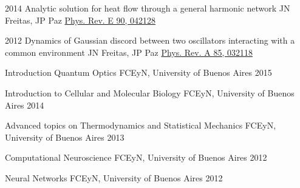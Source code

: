 \begin{cvpubs}
\cvpub
    {2014}
    {Analytic solution for heat flow through a general harmonic network}
    {JN Freitas, JP Paz}
    {\href{http://journals.aps.org/pre/abstract/10.1103/PhysRevE.90.042128}{Phys. Rev. E 90, 042128}}

\cvpub
    {2012}
    {Dynamics of Gaussian discord between two oscillators interacting with a common environment}
    {JN Freitas, JP Paz}
    {\href{http://pra.aps.org/abstract/PRA/v85/i3/e032118}{Phys. Rev. A 85, 032118}}

\end{cvpubs}


\begin{cvhonors}

  \cvhonor
    {Introduction Quantum Optics}
    {FCEyN, University of Buenos Aires} %
    {} %
    {2015} %

  \cvhonor
    {Introduction to Cellular and Molecular Biology}
    {FCEyN, University of Buenos Aires}
    {}
    {2014}

  \cvhonor
    {Advanced topics on Thermodynamics and Statistical Mechanics}
    {FCEyN, University of Buenos Aires}
    {}
    {2013}

  \cvhonor
    {Computational Neuroscience}
    {FCEyN, University of Buenos Aires}
    {}
    {2012}

  \cvhonor
    {Neural Networks}
    {FCEyN, University of Buenos Aires}
    {}
    {2012}

\end{cvhonors}
